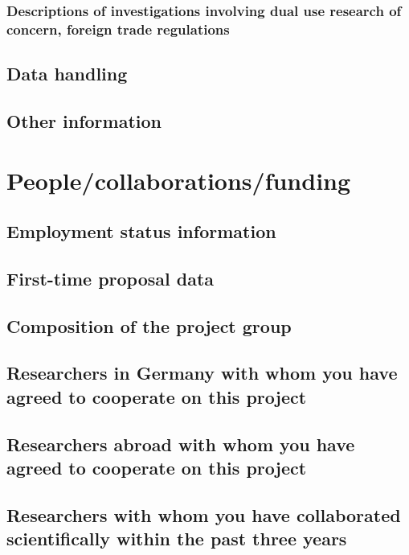 \documentclass{scrartcl}
\begin{document}
\subsubsection{Descriptions of investigations involving dual use research of concern, foreign trade regulations}

\subsection{Data handling}

\subsection{Other information}


\section{People/collaborations/funding}

\subsection{Employment status information}

\subsection{First-time proposal data}

\subsection{Composition of the project group}

\subsection{Researchers in Germany with whom you have agreed to cooperate on this project}

\subsection{Researchers abroad with whom you have agreed to cooperate on this project}

\subsection{Researchers with whom you have collaborated scientifically within the past three years}
\end{document}
